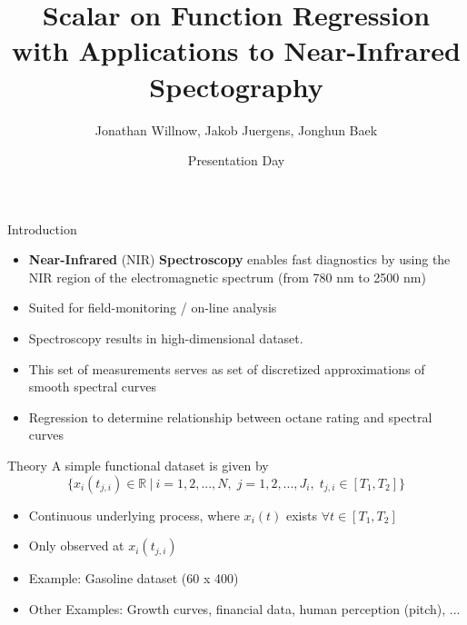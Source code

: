 \documentclass{beamer}
\title{Scalar on Function Regression \\
with Applications to Near-Infrared Spectography}
\author{Jonathan Willnow, Jakob Juergens, Jonghun Baek}
\date{{\color{red}}Presentation Day}
\begin{document}
	
	\begin{frame}
		\titlepage 
	\end{frame}
	
	\logo{}
	
	
	\begin{frame}{Introduction}
	
		\begin{itemize}
			\item \textbf{Near-Infrared} (NIR) \textbf{Spectroscopy} enables fast diagnostics by using the NIR region of the electromagnetic spectrum (from 780 nm to 2500 nm)
			\item Suited for field-monitoring / on-line analysis
			\item Spectroscopy results in high-dimensional dataset.	
			\item This set of measurements serves as set of discretized approximations of smooth spectral curves
			\item Regression to determine relationship between octane rating and spectral curves
			\end{itemize}
	\end{frame}
	
	\begin{frame}{Theory}
		A simple functional dataset is given by 
		$$\{x_{i}(t_{j,i}) \in \mathbb{R} \: \vert \: i = 1,2,...,N, \; j = 1,2,..., J_i, \; t_{j,i} \in [T_1, T_2] \}$$
		
		\begin{itemize}
			\item Continuous underlying process, where $x_i(t)$ exists $\forall t \in [T_1, T_2]$
			\item Only observed at $x_{i}(t_{j,i})$
			\item Example: Gasoline dataset (60 x 400)
			\item Other Examples: Growth curves, financial data, human perception (pitch), ...
			
		\end{itemize}
	\end{frame}

\end{document}
